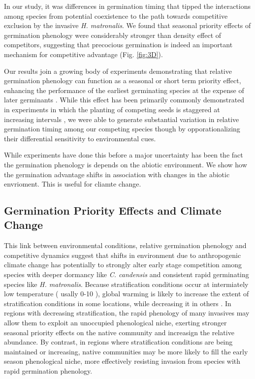 \documentclass{article}\usepackage[]{graphicx}\usepackage[]{color}
\begin{document}
In our study, it was differences in germination timing that tipped the interactions among species from potential coexistence to the path towards competitive exclusion by the invasive \textit{H. matronalis}. We found that seasonal priority effects of germination phenology were considerably stronger than density effect of competitors, suggesting that precocious germination is indeed an important mechanism for competitive advantage (Fig. \ref{fig:3D}).

Our results join a growing body of experiments demonstrating that relative germination phenology can function as a seasonal or short term priority effect, enhancing the performance of the earliest germinating species at the expense of later germinants \citep{}. While this effect has been primarily commonly demonstrated in experiments in which the planting of competing seeds is staggered at increasing intervals \citep{}, we were able to generate substantial variation in relative germination timing among our competing species though by opporationalizing their differential sensitivity to environmental cues. 

While experiments have done this before a major uncertainty has been the fact the germination phenology is depends on the abiotic environment. We show how the germination advantage shifts in association with changes in the abiotic envrioment. This is useful for cliamte change.

\subsection{Germination Priority Effects and Climate Change}

This link between environmental conditions, relative germination phenology and competitive dynamics suggest that shifts in environment due to anthropogenic climate change has potentially to strongly alter early stage competition among species with deeper dormancy like \textit{C. candensis} and consistent rapid germinating species like \textit{H. matronalis}. Because stratification conditions occur at intermiately low temperature ( usally 0-10  \degreeC \citep{}), global warming is likely to increase the extent of stratification conditions in some locations, while decreasing it in others \citep{}. In regions with decreasing stratification, the rapid phenology of many invasives may allow them to exploit an unoccupied phenological niche, exerting stronger seasonal priority effects on the native community and increasign the relative abundance. By contrast, in regions where stratification conditions are being maintained or increasing, native communities may be more likely to fill the early season phenological niche, more effectively resisting invasion from species with rapid germination phenology.
\end{document}
